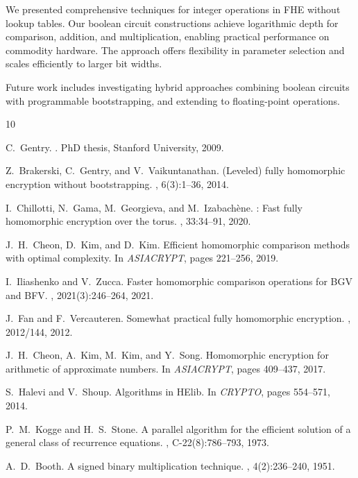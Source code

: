 \documentclass[11pt,a4paper]{article}
\begin{document}
We presented comprehensive techniques for integer operations in FHE without lookup tables. Our boolean circuit constructions achieve logarithmic depth for comparison, addition, and multiplication, enabling practical performance on commodity hardware. The approach offers flexibility in parameter selection and scales efficiently to larger bit widths.

Future work includes investigating hybrid approaches combining boolean circuits with programmable bootstrapping, and extending to floating-point operations.


\begin{thebibliography}{10}

C.~Gentry.
.
\newblock PhD thesis, Stanford University, 2009.

Z.~Brakerski, C.~Gentry, and V.~Vaikuntanathan.
\newblock (Leveled) fully homomorphic encryption without bootstrapping.
, 6(3):1--36, 2014.

I.~Chillotti, N.~Gama, M.~Georgieva, and M.~Izabach{\`e}ne.
: Fast fully homomorphic encryption over the torus.
, 33:34--91, 2020.

J.~H.~Cheon, D.~Kim, and D.~Kim.
\newblock Efficient homomorphic comparison methods with optimal complexity.
\newblock In {\em ASIACRYPT}, pages 221--256, 2019.

I.~Iliashenko and V.~Zucca.
\newblock Faster homomorphic comparison operations for {BGV} and {BFV}.
, 2021(3):246--264, 2021.

J.~Fan and F.~Vercauteren.
\newblock Somewhat practical fully homomorphic encryption.
, 2012/144, 2012.

J.~H.~Cheon, A.~Kim, M.~Kim, and Y.~Song.
\newblock Homomorphic encryption for arithmetic of approximate numbers.
\newblock In {\em ASIACRYPT}, pages 409--437, 2017.

S.~Halevi and V.~Shoup.
\newblock Algorithms in {HElib}.
\newblock In {\em CRYPTO}, pages 554--571, 2014.

P.~M.~Kogge and H.~S.~Stone.
\newblock A parallel algorithm for the efficient solution of a general class of recurrence equations.
, C-22(8):786--793, 1973.

A.~D.~Booth.
\newblock A signed binary multiplication technique.
, 4(2):236--240, 1951.

\end{thebibliography}
\end{document}
